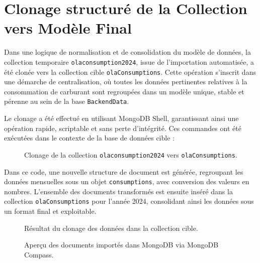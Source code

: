 \documentclass[a4paper,11pt]{report}
\begin{document}
\section{Clonage structuré de la Collection vers Modèle Final}

Dans une logique de normalisation et de consolidation du modèle de données, la collection temporaire \texttt{olaconsumption2024}, issue de l'importation automatisée, a été clonée vers la collection cible \texttt{olaConsumptions}. Cette opération s’inscrit dans une démarche de centralisation, où toutes les données pertinentes relatives à la consommation de carburant sont regroupées dans un modèle unique, stable et pérenne au sein de la base \texttt{BackendData}.

Le clonage a été effectué en utilisant MongoDB Shell, garantissant ainsi une opération rapide, scriptable et sans perte d’intégrité. Ces commandes ont été exécutées dans le contexte de la base de données cible :

\begin{figure}[H]
  \centering
  \setlength{\fboxrule}{1pt}
  \setlength{\fboxsep}{3pt}
  \caption{Clonage de la collection \texttt{olaconsumption2024} vers \texttt{olaConsumptions}.}
  \label{fig:clone-collection}
\end{figure}

Dans ce code, une nouvelle structure de document est générée, regroupant les données mensuelles sous un objet \texttt{consumptions}, avec conversion des valeurs en nombres. L’ensemble des documents transformés est ensuite inséré dans la collection \texttt{olaConsumptions} pour l’année 2024, consolidant ainsi les données sous un format final et exploitable.

\begin{figure}[H]
  \centering
  \setlength{\fboxrule}{1pt}
  \setlength{\fboxsep}{3pt}
  \caption{Résultat du clonage des données dans la collection cible.}
  \label{fig:clone-result}
\end{figure}

\begin{figure}[H]
  \centering
  \setlength{\fboxrule}{1pt}
  \setlength{\fboxsep}{3pt}
  \caption{Aperçu des documents importés dans MongoDB via MongoDB Compass.}
  \label{fig:compass-preview}
\end{figure}
\end{document}

